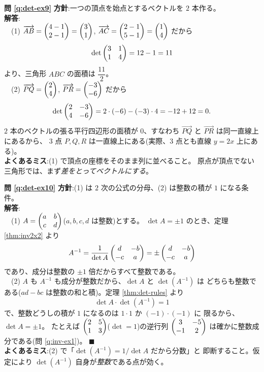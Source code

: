 \bigskip
\noindent\textbf{問 \ref{q:det-ex9}}\quad
\textbf{方針}:一つの頂点を始点とするベクトルを $2$ 本作る。\\
\textbf{解答}:\\
　(1) $\overrightarrow{AB} = \begin{pmatrix}4 - 1 \\ 2 - 1\end{pmatrix} = \begin{pmatrix}3 \\ 1\end{pmatrix}$,
$\overrightarrow{AC} = \begin{pmatrix}2 - 1 \\ 5 - 1\end{pmatrix} = \begin{pmatrix}1 \\ 4\end{pmatrix}$ だから
\[
\det \begin{pmatrix}3 & 1 \\ 1 & 4\end{pmatrix} = 12 - 1 = 11
\]
より、三角形 $ABC$ の面積は $\dfrac{11}{2}$。\\
　(2) $\overrightarrow{PQ} = \begin{pmatrix}2 \\ 4\end{pmatrix}$,
$\overrightarrow{PR} = \begin{pmatrix}-3 \\ -6\end{pmatrix}$ だから
\[
\det \begin{pmatrix}2 & -3 \\ 4 & -6\end{pmatrix} = 2 \cdot (-6) - (-3) \cdot 4 = -12 + 12 = 0.
\]
$2$ 本のベクトルの張る平行四辺形の面積が $0$、すなわち
$\overrightarrow{PQ}$ と $\overrightarrow{PR}$ は同一直線上にあるから、
$3$ 点 $P, Q, R$ は一直線上にある(実際、$3$ 点とも直線 $y = 2x$ 上にある)。\\
\textbf{よくあるミス}:(1) で頂点の座標をそのまま列に並べること。
原点が頂点でない三角形では、まず\emph{差をとってベクトルにする}。

\bigskip
\noindent\textbf{問 \ref{q:det-ex10}}\quad
\textbf{方針}:(1) は $2$ 次の公式の分母、(2) は整数の積が $1$ になる条件。\\
\textbf{解答}:\\
　(1) $A = \begin{pmatrix}a & b \\ c & d\end{pmatrix}$($a, b, c, d$ は整数)とする。
$\det A = \pm 1$ のとき、定理 \ref{thm:inv2x2} より
\[
A^{-1} = \frac{1}{\det A} \begin{pmatrix}d & -b \\ -c & a\end{pmatrix}
= \pm \begin{pmatrix}d & -b \\ -c & a\end{pmatrix}
\]
であり、成分は整数の $\pm 1$ 倍だからすべて整数である。\\
　(2) $A$ も $A^{-1}$ も成分が整数だから、$\det A$ と $\det(A^{-1})$ は
どちらも整数である($ad - bc$ は整数の和と積)。定理 \ref{thm:det-rules} より
\[
\det A \cdot \det(A^{-1}) = 1
\]
で、整数どうしの積が $1$ になるのは $1 \cdot 1$ か $(-1) \cdot (-1)$ に
限るから、$\det A = \pm 1$。
たとえば $\begin{pmatrix}2 & 5 \\ 1 & 3\end{pmatrix}$($\det = 1$)の逆行列
$\begin{pmatrix}3 & -5 \\ -1 & 2\end{pmatrix}$ は確かに整数成分である(問 \ref{q:inv-ex1})。
$\blacksquare$\\
\textbf{よくあるミス}:(2) で「$\det(A^{-1}) = 1/\det A$ だから分数」と
即断すること。仮定により $\det(A^{-1})$ 自身が\emph{整数}である点が効く。

